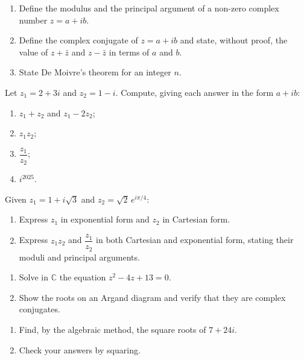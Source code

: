 \documentclass[11pt]{article}
\newcommand{\cle}[1]{{\popxbold\color{popdark}#1}}
\newcounter{popsec}
\newcounter{popsub}
\newcommand{\courssub}[1]{%
  \stepcounter{popsub}%
  \par\vspace{9pt}\noindent{\popxbold\fontsize{11.5}{13}\selectfont\color{popink}{\color{poporange}\thepopsec.\thepopsub}\hspace{6pt}#1}\par\nopagebreak\vspace{4pt}
}
\begin{document}
\begin{exercice}[Definitions]
\begin{enumerate}
\item Define the \cle{modulus} and the \cle{principal argument} of a non-zero complex number $z = a + ib$.
\item Define the \cle{complex conjugate} of $z = a + ib$ and state, without proof, the value of $z + \bar{z}$ and $z - \bar{z}$ in terms of $a$ and $b$.
\item State \cle{De Moivre's theorem} for an integer $n$.
\end{enumerate}
\end{exercice}

\begin{exercice}
Let $z_1 = 2 + 3i$ and $z_2 = 1 - i$. Compute, giving each answer in the form $a + ib$:
\begin{enumerate}
\item $z_1 + z_2$ and $z_1 - 2z_2$;
\item $z_1 z_2$;
\item $\dfrac{z_1}{z_2}$;
\item $i^{2025}$.
\end{enumerate}
\end{exercice}

\courssub{I practise}

\begin{exercice}
Given $z_1 = 1 + i\sqrt{3}$ and $z_2 = \sqrt{2}\,e^{i\pi/4}$:
\begin{enumerate}
\item Express $z_1$ in exponential form and $z_2$ in Cartesian form.
\item Express $z_1 z_2$ and $\dfrac{z_1}{z_2}$ in both Cartesian and exponential form, stating their moduli and principal arguments.
\end{enumerate}
\end{exercice}

\begin{exercice}
\begin{enumerate}
\item Solve in $\mathbb{C}$ the equation $z^2 - 4z + 13 = 0$.
\item Show the roots on an Argand diagram and verify that they are complex conjugates.
\end{enumerate}
\end{exercice}

\begin{exercice}
\begin{enumerate}
\item Find, by the algebraic method, the square roots of $7 + 24i$.
\item Check your answers by squaring.
\end{enumerate}
\end{exercice}
\end{document}
